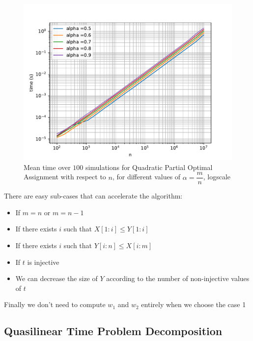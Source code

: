\documentclass[11pt]{beamer}
\begin{document}
\begin{frame}
\begin{figure}[H]
\includegraphics[scale=0.48]{a_time.pdf}
\caption{Mean time over $100$ simulations for Quadratic Partial Optimal Assignment with respect to $n$, for different values of $\alpha=\dfrac{m}{n}$, logscale}\label{a_time}
\end{figure}
\end{frame}

\begin{frame}

There are {\color{red}easy sub-cases} that can accelerate the algorithm:
\begin{itemize}
\item If $m=n$ or $m=n-1$ 
\item If there exists $i$ such that $X[1:i] \leqslant Y[1:i]$
\item If there exists $i$ such that $Y[i:n] \leqslant X[i:m]$
\item If $t$ is injective
\item We can decrease the size of $Y$ according to the number of non-injective values of $t$
\end{itemize}

Finally we don't need to compute $w_1$ and $w_2$ entirely when we choose the case 1
\end{frame}


\subsection{Quasilinear Time Problem Decomposition}
\end{document}
